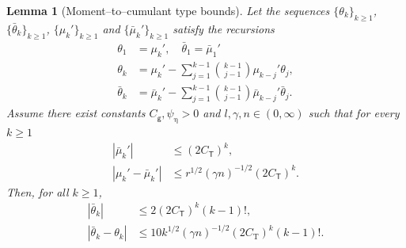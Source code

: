 \documentclass{article}
\newtheorem{lemma}{Lemma}[section]
\begin{document}
\begin{lemma}[Moment--to--cumulant type bounds]\label{lemma:empirical-cumulant-var-general}
Let the sequences $\{\theta_k\}_{k\ge 1}$, $\{\bar\theta_k\}_{k\ge 1}$,  
$\{\mu_k'\}_{k\ge 1}$ and $\{\bar\mu_k'\}_{k\ge 1}$ satisfy the recursions
\begin{align}
  \theta_1 &= \mu_k', \quad \bar{\theta}_1 = \bar{\mu}_1' \label{eq:theta-init-general} \\
  \theta_k
  &=\mu_k'
    -\sum_{j=1}^{k-1}\binom{k-1}{\,j-1\,}\mu_{k-j}'\theta_j, \label{eq:theta-recursion-general} \\
  \bar\theta_k
  &=\bar\mu_k'
    -\sum_{j=1}^{k-1}\binom{k-1}{\,j-1\,}\bar\mu_{k-j}'\bar\theta_j.
    \label{eq:theta-bar-recursion-general}
\end{align}
Assume there exist constants $C_{\mathsf g},\psi_{\upeta}>0$ and
$l,\gamma,n\in(0,\infty)$ such that for every $k\ge 1$
\begin{align}
  |\bar\mu_k'|
    &\le (2C_{\mathsf{T}})^k,
        \label{eq:mu-bar-bound-general}\\
  |\mu_k'-\bar\mu_k'|
    &\le r^{1/2}(\gamma n)^{-1/2}(2C_{\mathsf{T}})^k.
        \label{eq:mu-diff-bound-general}
\end{align}
Then, for all $k\ge 1$,
\begin{align}
  |\bar\theta_k|
    &\le 2(2C_{\mathsf{T}})^k(k-1)!, 
       \label{eq:theta-bar-bound-general}\\
  |\bar\theta_k-\theta_k|
    &\le 10 k^{1/2}(\gamma n)^{-1/2}(2C_{\mathrm{T}})^k(k-1)!.
       \label{eq:theta-diff-bound-general}
\end{align}
\end{lemma}
\end{document}
